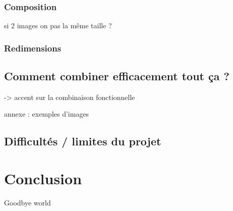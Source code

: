 \documentclass{article}
\begin{document}
\subsubsection{Composition}
si 2 images on pas la même taille ? 

\subsubsection{Redimensions}


\subsection{Comment combiner efficacement tout ça ?}
-> accent sur la combinaison fonctionnelle

annexe : exemples d'images

\subsection{Difficultés / limites du projet}

\section*{Conclusion}
Goodbye world
\end{document}
